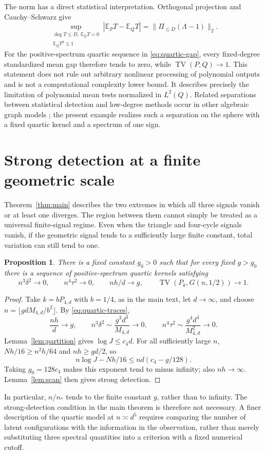 \documentclass[11pt,reqno]{amsart}
\numberwithin{equation}{section}
\newtheorem{proposition}[theorem]{Proposition}
\theoremstyle{definition}
\theoremstyle{remark}
\theoremstyle{definition}
\DeclareMathOperator{\TV}{TV}
\begin{document}
The norm has a direct statistical interpretation. Orthogonal projection and Cauchy--Schwarz give
\[
 \sup_{\substack{\deg T\le D,\ \mathbb E_QT=0\\\mathbb E_QT^2\le1}}
     |\mathbb E_PT-\mathbb E_QT|
 =\|\Pi_{\le D}(\Lambda-1)\|_2.
\]
For the positive-spectrum quartic sequence in \eqref{eq:quartic-gap}, every fixed-degree standardized mean gap therefore tends to zero,
while $\TV(P,Q)\to1$.
This statement does not rule out arbitrary nonlinear processing of polynomial outputs and is not a computational complexity lower bound.
It describes precisely the limitation of polynomial mean tests normalized in $L^2(Q)$.
Related separations between statistical detection and low-degree methods occur in other algebraic graph models \cite{BBalgebra};
the present example realizes such a separation on the sphere with a fixed quartic kernel and a spectrum of one sign.

\section{Strong detection at a finite geometric scale}\label{app:critical}
Theorem~\ref{thm:main} describes the two extremes in which all three signals vanish or at least one diverges.
The region between them cannot simply be treated as a universal finite-signal regime.
Even when the triangle and four-cycle signals vanish, if the geometric signal tends to a sufficiently large finite constant,
total variation can still tend to one.

\begin{proposition}\label{prop:finite-G}
There is a fixed constant $g_0>0$ such that for every fixed $g>g_0$ there is a sequence of positive-spectrum quartic kernels satisfying
\[
 n^3\delta^2\to0,\qquad n^4\tau^2\to0,\qquad nh/d\to g,
 \qquad \TV(P_k,G(n,1/2))\to1.
\]
\end{proposition}
\begin{proof}
Take $k=bP_{4,d}$ with $b=1/4$, as in the main text, let $d\to\infty$, and choose
$n=\lfloor gdM_{4,d}/b^2\rfloor$.
By \eqref{eq:quartic-traces},
\[
 \frac{nh}{d}\to g,\qquad
 n^3\delta^2\sim\frac{g^3d^3}{M_{4,d}}\to0,\qquad
 n^4\tau^2\sim\frac{g^4d^4}{M_{4,d}^2}\to0.
\]
Lemma~\ref{lem:partition} gives $\log J\le c_4d$.
For all sufficiently large $n$, $Nh/16\ge n^2h/64$ and $nh\ge gd/2$, so
\[
 n\log J-Nh/16\le nd(c_4-g/128).
\]
Taking $g_0=128c_4$ makes this exponent tend to minus infinity; also $nh\to\infty$.
Lemma~\ref{lem:scan} then gives strong detection.
\end{proof}

In particular, $n/n_*$ tends to the finite constant $g$, rather than to infinity.
The strong-detection condition in the main theorem is therefore not necessary.
A finer description of the quartic model at $n\asymp d^5$ requires comparing the number of latent configurations with the information in the observation,
rather than merely substituting three spectral quantities into a criterion with a fixed numerical cutoff.

\clearpage

\end{document}
